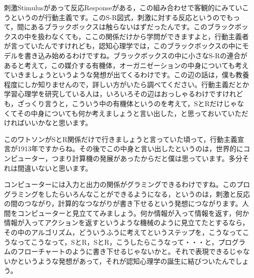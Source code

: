 \documentclass{ltjsbook}
\begin{document}
刺激Stimulusがあって反応Responseがある，この組み合わせで客観的にみていこうというのが行動主義です。このS-R図式，刺激に対する反応というのでもって，間にあるブラックボックスは触らないはずだったんです。このブラックボックスの中を扱わなくても，ここの関係だけから学問ができますよと，行動主義者が言っていたんですけれども，認知心理学では，このブラックボックスの中にモデルを書き込み始めるわけですね。ブラックボックスの中に小さなS-Rの連合があると考えて，この媒介する有機体，オーガニゼーションの中身についても考えていきましょうというような発想が出てくるわけです。この辺の話は，僕も教養程度にしか知りませんので，詳しい方がいたら調べてください。行動主義だとか学習心理学を研究している人は，いろいろその辺はおっしゃるわけですけれども，ざっくり言うと，こういう中の有機体というのを考えて，SとRだけじゃなくてその中身についても何か考えましょうと言い出した，と思っておいていただければいいかなと思います。

このワトソンがSとR関係だけで行きましょうと言っていた頃って，行動主義宣言が1913年ですからね\parencite{Watson1913}。その後でこの中身と言い出したというのは，世界的にコンピューター，つまり計算機の発展があったからだと僕は思っています。多分それは間違いないと思います。

コンピューターには入力と出力の関係がグラミングできるわけですね。このプログラミングをしたらいろんなことができるようになる，というのは，刺激と反応の間のつながり，計算的なつながりが書き下せるという発想につながります。人間をコンピューターと見立ててみましょう。何か情報が入って情報を返す，何か情報が入ってアクションを返すというような機械のように見立てたとするなら，その中のアルゴリズム，どういうふうに考えてというステップを，こうなってこうなってこうなって，SとR，SとR，こうしたらこうなって・・・と，プログラムのフローチャートのように書き下せるじゃないかと。それで表現できるじゃないかというような発想があって，それが認知心理学の誕生に結びついたんでしょう。
\end{document}
